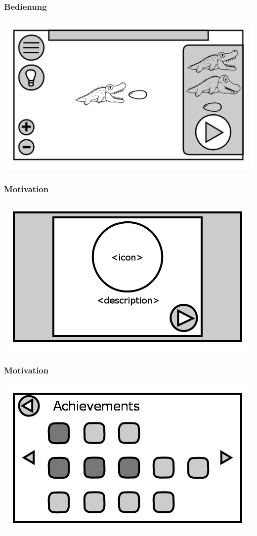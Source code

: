 \documentclass[t]{beamer}
\begin{document}
\begin{frame}
	\frametitle{Bedienung}
	\includegraphics[height=\textheight]{level.png}
\end{frame}
\begin{frame}
	\frametitle{Motivation}
	\includegraphics[height=\textheight]{achievement_notification.png}
\end{frame}
\begin{frame}
	\frametitle{Motivation}
	\includegraphics[height=\textheight]{achievements.png}
\end{frame}
\end{document}
